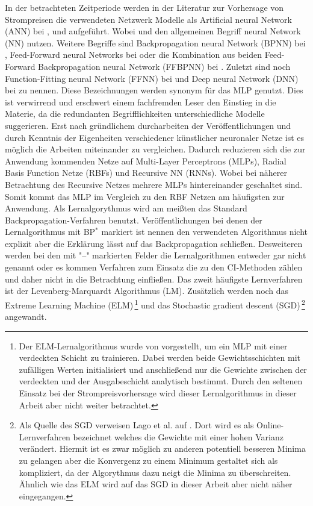 In der betrachteten Zeitperiode werden in der Literatur zur Vorhersage von Strompreisen die verwendeten Netzwerk Modelle als Artificial neural Network (ANN) bei \citet{Mirakyan2017}, \citet{Gao2017} und \citet{Sandhu2016} aufgeführt. Wobei \citet{Davo2016} und \citet{Domanski2017} den allgemeinen Begriff neural Network (NN) nutzen. Weitere Begriffe sind Backpropagation neural Network (BPNN) bei \citet{Wang2017}, Feed-Forward neural Networks bei \citet{Keles2016} oder die Kombination aus beiden Feed-Forward Backpropagation neural Network (FFBPNN) bei \citet{Peter2016}. Zuletzt sind noch Function-Fitting neural Network (FFNN) bei \citet{Marcos2017} und Deep neural Network (DNN) bei \citet{Lago2018} zu nennen. Diese Bezeichnungen werden synonym für das MLP genutzt. Dies ist verwirrend und erschwert einem fachfremden Leser den Einstieg in die Materie, da die redundanten Begrifflichkeiten unterschiedliche Modelle suggerieren. Erst nach gründlichem durcharbeiten der Veröffentlichungen und durch Kenntnis der Eigenheiten verschiedener künstlicher neuronaler Netze ist es möglich die Arbeiten miteinander zu vergleichen. Dadurch reduzieren sich die zur Anwendung kommenden Netze auf Multi-Layer Perceptrons (MLPs), Radial Basis Function Netze (RBFs) und Recursive NN (RNNs). Wobei bei näherer Betrachtung des Recursive Netzes mehrere MLPs hintereinander geschaltet sind. Somit kommt das MLP im Vergleich zu den RBF Netzen am häufigsten zur Anwendung. Als Lernalgorythmus wird am meißten das Standard Backpropagation-Verfahren benutzt. Veröffentlichungen bei denen der Lernalgorithmus mit BP$^{*}$ markiert ist nennen den verwendeten Algorithmus nicht explizit aber die Erklärung lässt auf das Backpropagation schließen. Desweiteren werden bei den mit "--" markierten Felder die Lernalgorithmen entweder gar nicht genannt oder es kommen Verfahren zum Einsatz die zu den CI-Methoden zählen und daher nicht in die Betrachtung einfließen. Das zweit häufigste Lernverfahren ist der Levenberg-Marquardt Algorithmus (LM). Zusätzlich werden noch das Extreme Learning Machine (ELM)\,\footnote{Der ELM-Lernalgorithmus wurde von \citet{Huang2004} vorgestellt, um ein MLP mit einer verdeckten Schicht zu trainieren. Dabei werden beide Gewichtsschichten mit zufälligen Werten initialisiert und anschließend nur die Gewichte zwischen der verdeckten und der Ausgabeschicht analytisch bestimmt. Durch den seltenen Einsatz bei der Strompreisvorhersage wird dieser Lernalgorithmus in dieser Arbeit aber nicht weiter betrachtet.} und das Stochastic gradient descent (SGD)\,\footnote{Als Quelle des SGD verweisen Lago et al. auf \citet{Ruder2016}. Dort wird es als Online-Lernverfahren bezeichnet welches die Gewichte mit einer hohen Varianz verändert. Hiermit ist es zwar möglich zu anderen potentiell besseren Minima zu gelangen aber die Konvergenz zu einem Minimum gestaltet sich als kompliziert, da der Algorythmus dazu neigt die Minima zu überschreiten. Ähnlich wie das ELM wird auf das SGD in dieser Arbeit aber nicht näher eingegangen.} angewandt. 

